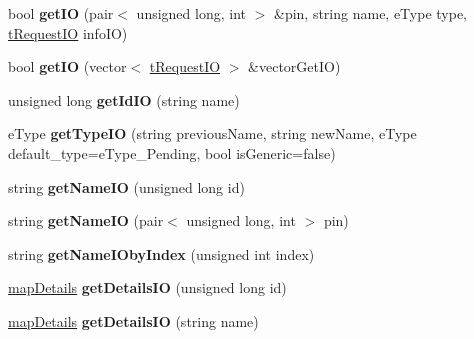 \begin{DoxyCompactItemize}
\item 
\hypertarget{class_ladder_diagram_a7b37c1e8ef6be6b94cff1d7d80d09f35}{bool {\bfseries get\-I\-O} (pair$<$ unsigned long, int $>$ \&pin, string name, e\-Type type, \hyperlink{structt_request_i_o}{t\-Request\-I\-O} info\-I\-O)}\label{class_ladder_diagram_a7b37c1e8ef6be6b94cff1d7d80d09f35}

\item 
\hypertarget{class_ladder_diagram_a9b9c92f48edb09a420d66dfa8756ec00}{bool {\bfseries get\-I\-O} (vector$<$ \hyperlink{structt_request_i_o}{t\-Request\-I\-O} $>$ \&vector\-Get\-I\-O)}\label{class_ladder_diagram_a9b9c92f48edb09a420d66dfa8756ec00}

\item 
\hypertarget{class_ladder_diagram_afbffadf3511abda504ca97b95a038cf0}{unsigned long {\bfseries get\-Id\-I\-O} (string name)}\label{class_ladder_diagram_afbffadf3511abda504ca97b95a038cf0}

\item 
\hypertarget{class_ladder_diagram_a161151fa00e1c0c8a1c57754aae2a345}{e\-Type {\bfseries get\-Type\-I\-O} (string previous\-Name, string new\-Name, e\-Type default\-\_\-type=e\-Type\-\_\-\-Pending, bool is\-Generic=false)}\label{class_ladder_diagram_a161151fa00e1c0c8a1c57754aae2a345}

\item 
\hypertarget{class_ladder_diagram_ab3b47cda26c1f26d468580ff0a5c673a}{string {\bfseries get\-Name\-I\-O} (unsigned long id)}\label{class_ladder_diagram_ab3b47cda26c1f26d468580ff0a5c673a}

\item 
\hypertarget{class_ladder_diagram_af71e624ff9e8ba478c8ec23339926a88}{string {\bfseries get\-Name\-I\-O} (pair$<$ unsigned long, int $>$ pin)}\label{class_ladder_diagram_af71e624ff9e8ba478c8ec23339926a88}

\item 
\hypertarget{class_ladder_diagram_a294d9eeecb8dfd00b360942a138f56b9}{string {\bfseries get\-Name\-I\-Oby\-Index} (unsigned int index)}\label{class_ladder_diagram_a294d9eeecb8dfd00b360942a138f56b9}

\item 
\hypertarget{class_ladder_diagram_a52b127e537e797485623b8724d33c061}{\hyperlink{structmap_details}{map\-Details} {\bfseries get\-Details\-I\-O} (unsigned long id)}\label{class_ladder_diagram_a52b127e537e797485623b8724d33c061}

\item 
\hypertarget{class_ladder_diagram_a678e02cf1af173571524a0529566e847}{\hyperlink{structmap_details}{map\-Details} {\bfseries get\-Details\-I\-O} (string name)}\label{class_ladder_diagram_a678e02cf1af173571524a0529566e847}


\end{DoxyCompactItemize}
